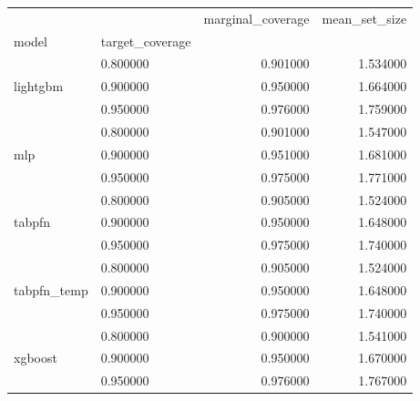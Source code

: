 \begin{tabular}{llrr}
\toprule
 &  & marginal_coverage & mean_set_size \\
model & target_coverage &  &  \\
\midrule
\multirow[t]{3}{*}{lightgbm} & 0.800000 & 0.901000 & 1.534000 \\
 & 0.900000 & 0.950000 & 1.664000 \\
 & 0.950000 & 0.976000 & 1.759000 \\
\cline{1-4}
\multirow[t]{3}{*}{mlp} & 0.800000 & 0.901000 & 1.547000 \\
 & 0.900000 & 0.951000 & 1.681000 \\
 & 0.950000 & 0.975000 & 1.771000 \\
\cline{1-4}
\multirow[t]{3}{*}{tabpfn} & 0.800000 & 0.905000 & 1.524000 \\
 & 0.900000 & 0.950000 & 1.648000 \\
 & 0.950000 & 0.975000 & 1.740000 \\
\cline{1-4}
\multirow[t]{3}{*}{tabpfn_temp} & 0.800000 & 0.905000 & 1.524000 \\
 & 0.900000 & 0.950000 & 1.648000 \\
 & 0.950000 & 0.975000 & 1.740000 \\
\cline{1-4}
\multirow[t]{3}{*}{xgboost} & 0.800000 & 0.900000 & 1.541000 \\
 & 0.900000 & 0.950000 & 1.670000 \\
 & 0.950000 & 0.976000 & 1.767000 \\
\cline{1-4}
\bottomrule
\end{tabular}
